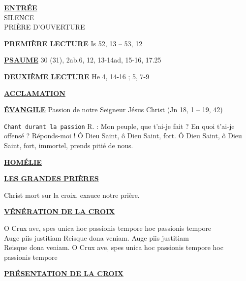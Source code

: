 \documentclass[11pt,a4paper]{article}
\newcommand{\SepRule}{\noindent							 %
						\begin{center}
							\rule{250pt}{1pt}
						\end{center}
						}
\newcommand{\NewsItem}[1]{%
\vspace{3pt}
\underline{\textbf{#1}}
		  }
\begin{document}
\setlength{\parindent}{0pt}





\begin{center}
\NewsItem{ENTRÉE} \\
SILENCE\\
PRIÈRE D'OUVERTURE
\end{center}

\NewsItem{PREMIÈRE LECTURE} Is 52, 13 – 53, 12

\begin{framed}
\NewsItem{PSAUME} 30 (31), 2ab.6, 12, 13-14ad, 15-16, 17.25

\end{framed}

\NewsItem{DEUXIÈME LECTURE} He 4, 14-16 ; 5, 7-9

\NewsItem{ACCLAMATION}
	
\begin{framed}
\NewsItem{ÉVANGILE} Passion de notre Seigneur Jésus Christ (Jn 18, 1 – 19, 42)

\texttt{Chant durant la passion}  R. : Mon peuple, que t'ai-je fait ? En quoi
t'ai-je offensé ? Réponds-moi ! Ô Dieu Saint, ô Dieu Saint, fort.
Ô Dieu Saint, ô Dieu Saint, fort, immortel, prends pitié de nous.
\end{framed}
\NewsItem{HOMÉLIE}

\NewsItem{LES GRANDES PRIÈRES}

Christ mort sur la croix, exauce notre prière.

\NewsItem{VÉNÉRATION DE LA CROIX} 
\begin{framed}
O Crux ave, spes unica hoc passionis tempore hoc passionis tempore\\
Auge piis justitiam Reisque dona veniam. Auge piis justitiam\\
Reisque dona veniam. O Crux ave, spes unica hoc passionis tempore hoc
passionis tempore
\end{framed}

\NewsItem{PRÉSENTATION DE LA CROIX} 
\end{document}
